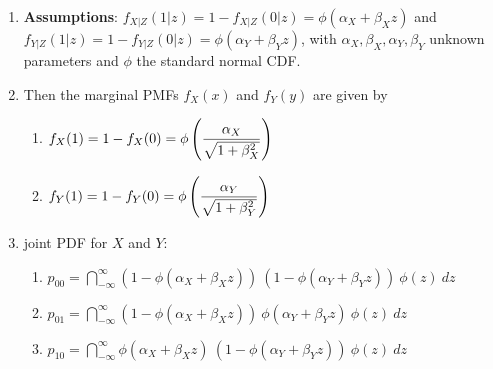 \begin{enumerate}
    \item \textbf{Assumptions}:  $f_{X|Z} (1|z) = 1 - f_{X|Z} (0|z) = \phi(\alpha_X + \beta_X z)$ and $f _{Y |Z} (1|z) = 1 - f_{Y |Z} (0|z) = \phi(\alpha_Y + \beta_Y z)$, with $\alpha_X , \beta_X , \alpha_Y , \beta_Y$ unknown parameters and $\phi$ the standard normal CDF.
    \hfill \cite{statistics/book/Statistics-for-Data-Scientists/Maurits-Kaptein}

    \item Then the marginal PMFs $f_X (x)$ and $f_Y (y)$ are given by
    \begin{multicols}{2}
    \begin{enumerate}
        \item
        $
            f_X (1)
            = 1 - f_X (0)
            = \phi\left(\dfrac{\alpha_X}{\sqrt{1 + \beta^2_X}}\right)
        $
        \hfill \cite{statistics/book/Statistics-for-Data-Scientists/Maurits-Kaptein}

        \item
        $
            f_Y (1)
            = 1 - f_Y (0)
            = \phi\left(\dfrac{\alpha_Y}{\sqrt{1 + \beta^2_Y}}\right)
        $
        \hfill \cite{statistics/book/Statistics-for-Data-Scientists/Maurits-Kaptein}
    \end{enumerate}
    \end{multicols}

    \item joint PDF for $X$ and $Y$:
    \begin{enumerate}
        \item
        $
            p_{00}
            = \dint ^{\infty} _{-\infty} (1 - \phi(\alpha_X + \beta_X z))\ (1 - \phi(\alpha_Y + \beta_Y z))\ \phi(z)\ dz
        $
        \hfill \cite{statistics/book/Statistics-for-Data-Scientists/Maurits-Kaptein}

        \item
        $
            p_{01}
            = \dint ^{\infty} _{-\infty} (1 - \phi(\alpha_X + \beta_X z))\ \phi(\alpha_Y + \beta_Y z)\ \phi(z)\ dz
        $
        \hfill \cite{statistics/book/Statistics-for-Data-Scientists/Maurits-Kaptein}

        \item
        $
            p_{10}
            = \dint ^{\infty} _{-\infty} \phi(\alpha_X + \beta_X z)\ (1 - \phi(\alpha_Y + \beta_Y z))\ \phi(z)\ dz
        $
        \hfill \cite{statistics/book/Statistics-for-Data-Scientists/Maurits-Kaptein}


\end{enumerate}
\end{enumerate}
